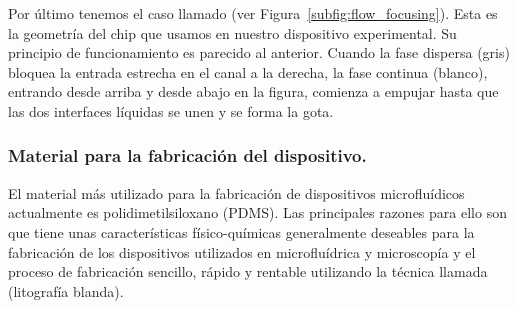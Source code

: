 

Por último tenemos el caso llamado  (ver Figura~\ref{subfig:flow_focusing}). Esta es la geometría del chip  que usamos en nuestro dispositivo experimental. Su principio de funcionamiento es parecido al anterior. Cuando la fase dispersa (gris) bloquea la entrada estrecha en el canal a la derecha, la fase continua (blanco), entrando desde arriba y desde abajo en la figura, comienza a empujar hasta que las dos interfaces líquidas se unen y se forma la gota.

\subsubsection{Material para la fabricación del dispositivo.}\label{sec:antecedentes:materiales_chip}

El material más utilizado para la fabricación de dispositivos microfluídicos actualmente es polidimetilsiloxano (PDMS). Las principales razones para ello son que tiene unas características físico-químicas generalmente deseables para la fabricación de los dispositivos utilizados en microfluídrica y microscopía y el proceso de fabricación sencillo, rápido y rentable utilizando la técnica llamada (litografía blanda).

